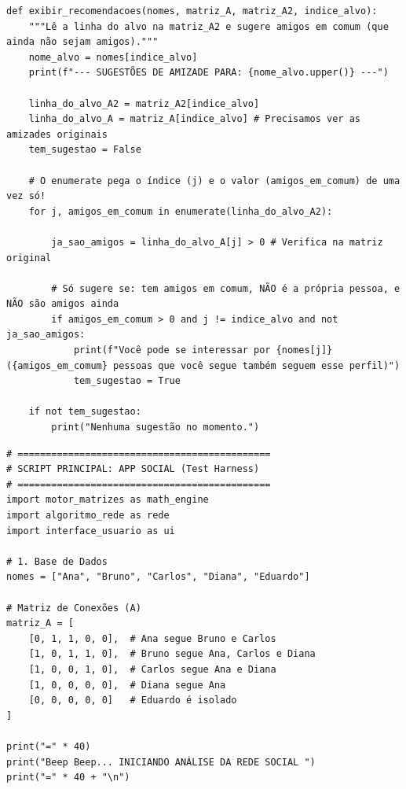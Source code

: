 \documentclass[../numerical_methods.tex]{subfiles}
\begin{document}
\begin{verbatim}
def exibir_recomendacoes(nomes, matriz_A, matriz_A2, indice_alvo):
    """Lê a linha do alvo na matriz_A2 e sugere amigos em comum (que ainda não sejam amigos)."""
    nome_alvo = nomes[indice_alvo]
    print(f"--- SUGESTÕES DE AMIZADE PARA: {nome_alvo.upper()} ---")

    linha_do_alvo_A2 = matriz_A2[indice_alvo]
    linha_do_alvo_A = matriz_A[indice_alvo] # Precisamos ver as amizades originais
    tem_sugestao = False

    # O enumerate pega o índice (j) e o valor (amigos_em_comum) de uma vez só!
    for j, amigos_em_comum in enumerate(linha_do_alvo_A2):

        ja_sao_amigos = linha_do_alvo_A[j] > 0 # Verifica na matriz original

        # Só sugere se: tem amigos em comum, NÃO é a própria pessoa, e NÃO são amigos ainda
        if amigos_em_comum > 0 and j != indice_alvo and not ja_sao_amigos:
            print(f"Você pode se interessar por {nomes[j]} ({amigos_em_comum} pessoas que você segue também seguem esse perfil)")
            tem_sugestao = True

    if not tem_sugestao:
        print("Nenhuma sugestão no momento.")
\end{verbatim}

\begin{listing}[H]
	\begin{verbatim}
# =============================================
# SCRIPT PRINCIPAL: APP SOCIAL (Test Harness)
# =============================================
import motor_matrizes as math_engine
import algoritmo_rede as rede
import interface_usuario as ui

# 1. Base de Dados
nomes = ["Ana", "Bruno", "Carlos", "Diana", "Eduardo"]

# Matriz de Conexões (A)
matriz_A = [
    [0, 1, 1, 0, 0],  # Ana segue Bruno e Carlos
    [1, 0, 1, 1, 0],  # Bruno segue Ana, Carlos e Diana
    [1, 0, 0, 1, 0],  # Carlos segue Ana e Diana
    [1, 0, 0, 0, 0],  # Diana segue Ana
    [0, 0, 0, 0, 0]   # Eduardo é isolado
]

print("=" * 40)
print("Beep Beep... INICIANDO ANÁLISE DA REDE SOCIAL ")
print("=" * 40 + "\n")
\end{verbatim}
\end{listing}
\end{document}
